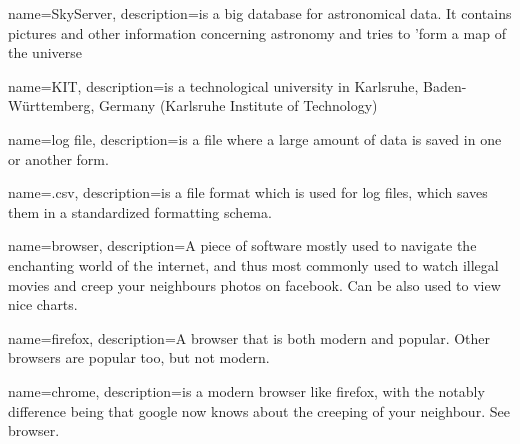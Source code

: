 {
  name=SkyServer,
  description={is a big database for astronomical data. It contains pictures
              and other information concerning astronomy and tries to 'form a 
              map of the universe
              }
}


{
  name=KIT,
  description={is a technological university in Karlsruhe, Baden-Württemberg, Germany 
              (Karlsruhe Institute of Technology)}
}

{
  name=log file,
  description={is a file where a large amount of data is saved in one or another form.}
}

{
  name=.csv,
  description={is a file format which is used for log files, 
  which saves them in a standardized formatting schema.}
}

{
  name=browser,
  description={A piece of software mostly used to navigate the enchanting world of the internet, and thus most commonly
used to watch illegal movies and creep your neighbours photos on facebook. Can be also used to view nice charts.}
}

{
  name=firefox,
  description={A browser that is both modern and popular. Other browsers are popular too, but not modern. }
}

{
  name=chrome,
  description={is a modern browser like firefox, with the notably difference being that google now knows about the
creeping of your neighbour. See browser.}
}


  